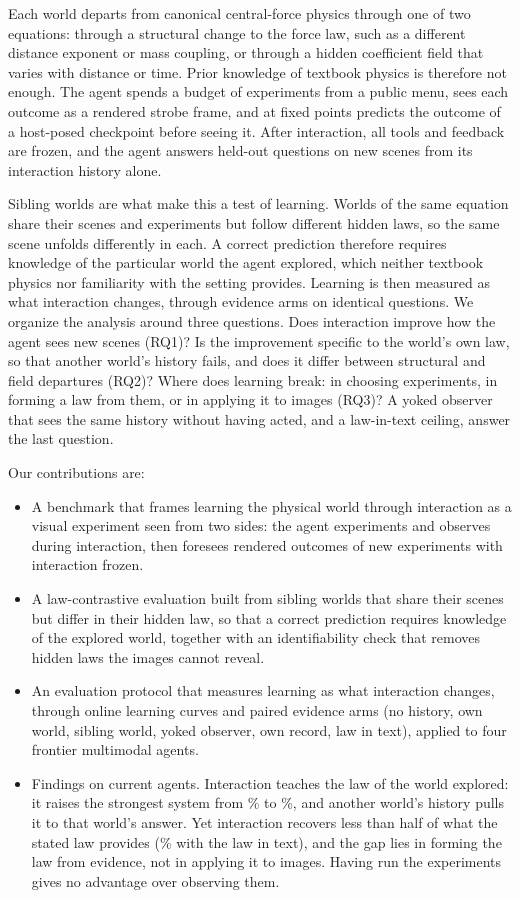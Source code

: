 Each world departs from canonical central-force physics through one of two equations: through a structural change to the force law, such as a different distance exponent or mass coupling, or through a hidden coefficient field that varies with distance or time. Prior knowledge of textbook physics is therefore not enough. The agent spends a budget of experiments from a public menu, sees each outcome as a rendered strobe frame, and at fixed points predicts the outcome of a host-posed checkpoint before seeing it. After interaction, all tools and feedback are frozen, and the agent answers held-out questions on new scenes from its interaction history alone.

Sibling worlds are what make this a test of learning. Worlds of the same equation share their scenes and experiments but follow different hidden laws, so the same scene unfolds differently in each. A correct prediction therefore requires knowledge of the particular world the agent explored, which neither textbook physics nor familiarity with the setting provides. Learning is then measured as what interaction changes, through evidence arms on identical questions. We organize the analysis around three questions. Does interaction improve how the agent sees new scenes (RQ1)? Is the improvement specific to the world's own law, so that another world's history fails, and does it differ between structural and field departures (RQ2)? Where does learning break: in choosing experiments, in forming a law from them, or in applying it to images (RQ3)? A yoked observer that sees the same history without having acted, and a law-in-text ceiling, answer the last question.

Our contributions are:
\begin{itemize}
  \item A benchmark that frames learning the physical world through interaction as a visual experiment seen from two sides: the agent experiments and observes during interaction, then foresees rendered outcomes of new experiments with interaction frozen.
  \item A law-contrastive evaluation built from sibling worlds that share their scenes but differ in their hidden law, so that a correct prediction requires knowledge of the explored world, together with an identifiability check that removes hidden laws the images cannot reveal.
  \item An evaluation protocol that measures learning as what interaction changes, through online learning curves and paired evidence arms (no history, own world, sibling world, yoked observer, own record, law in text), applied to four frontier multimodal agents.
  \item Findings on current agents. Interaction teaches the law of the world explored: it raises the strongest system from \% to \%, and another world's history pulls it to that world's answer. Yet interaction recovers less than half of what the stated law provides (\% with the law in text), and the gap lies in forming the law from evidence, not in applying it to images. Having run the experiments gives no advantage over observing them.
\end{itemize}

